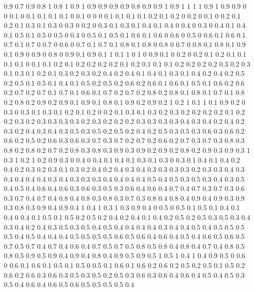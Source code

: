 0.9 0.7
0.9 0.8
1 0.8
1 0.9
1 0.9
0.9 0.9
0.9 0.8
0.9 0.9
1 0.9
1 1
1 1
0.9 1
0.9 0.9
0 0
0.1 0
0.1 0.1
0.1 0.1
0 0.1
0 0
0 0.1
0.1 0.1
0.1 0.2
0.1 0.2
0 0.2
0 0.1
0 0.2
0.1 0.2
0.1 0.3
0.1 0.3
0 0.3
0 0.2
0 0.3
0.1 0.3
0.1 0.4
0.1 0.4
0 0.4
0 0.3
0 0.4
0.1 0.4
0.1 0.5
0.1 0.5
0 0.5
0 0.4
0 0.5
0.1 0.5
0.1 0.6
0.1 0.6
0 0.6
0 0.5
0 0.6
0.1 0.6
0.1 0.7
0.1 0.7
0 0.7
0 0.6
0 0.7
0.1 0.7
0.1 0.8
0.1 0.8
0 0.8
0 0.7
0 0.8
0.1 0.8
0.1 0.9
0.1 0.9
0 0.9
0 0.8
0 0.9
0.1 0.9
0.1 1
0.1 1
0 1
0 0.9
0.1 0
0.2 0
0.2 0.1
0.2 0.1
0.1 0.1
0.1 0
0.1 0.1
0.2 0.1
0.2 0.2
0.2 0.2
0.1 0.2
0.1 0.1
0.1 0.2
0.2 0.2
0.2 0.3
0.2 0.3
0.1 0.3
0.1 0.2
0.1 0.3
0.2 0.3
0.2 0.4
0.2 0.4
0.1 0.4
0.1 0.3
0.1 0.4
0.2 0.4
0.2 0.5
0.2 0.5
0.1 0.5
0.1 0.4
0.1 0.5
0.2 0.5
0.2 0.6
0.2 0.6
0.1 0.6
0.1 0.5
0.1 0.6
0.2 0.6
0.2 0.7
0.2 0.7
0.1 0.7
0.1 0.6
0.1 0.7
0.2 0.7
0.2 0.8
0.2 0.8
0.1 0.8
0.1 0.7
0.1 0.8
0.2 0.8
0.2 0.9
0.2 0.9
0.1 0.9
0.1 0.8
0.1 0.9
0.2 0.9
0.2 1
0.2 1
0.1 1
0.1 0.9
0.2 0
0.3 0
0.3 0.1
0.3 0.1
0.2 0.1
0.2 0
0.2 0.1
0.3 0.1
0.3 0.2
0.3 0.2
0.2 0.2
0.2 0.1
0.2 0.2
0.3 0.2
0.3 0.3
0.3 0.3
0.2 0.3
0.2 0.2
0.2 0.3
0.3 0.3
0.3 0.4
0.3 0.4
0.2 0.4
0.2 0.3
0.2 0.4
0.3 0.4
0.3 0.5
0.3 0.5
0.2 0.5
0.2 0.4
0.2 0.5
0.3 0.5
0.3 0.6
0.3 0.6
0.2 0.6
0.2 0.5
0.2 0.6
0.3 0.6
0.3 0.7
0.3 0.7
0.2 0.7
0.2 0.6
0.2 0.7
0.3 0.7
0.3 0.8
0.3 0.8
0.2 0.8
0.2 0.7
0.2 0.8
0.3 0.8
0.3 0.9
0.3 0.9
0.2 0.9
0.2 0.8
0.2 0.9
0.3 0.9
0.3 1
0.3 1
0.2 1
0.2 0.9
0.3 0
0.4 0
0.4 0.1
0.4 0.1
0.3 0.1
0.3 0
0.3 0.1
0.4 0.1
0.4 0.2
0.4 0.2
0.3 0.2
0.3 0.1
0.3 0.2
0.4 0.2
0.4 0.3
0.4 0.3
0.3 0.3
0.3 0.2
0.3 0.3
0.4 0.3
0.4 0.4
0.4 0.4
0.3 0.4
0.3 0.3
0.3 0.4
0.4 0.4
0.4 0.5
0.4 0.5
0.3 0.5
0.3 0.4
0.3 0.5
0.4 0.5
0.4 0.6
0.4 0.6
0.3 0.6
0.3 0.5
0.3 0.6
0.4 0.6
0.4 0.7
0.4 0.7
0.3 0.7
0.3 0.6
0.3 0.7
0.4 0.7
0.4 0.8
0.4 0.8
0.3 0.8
0.3 0.7
0.3 0.8
0.4 0.8
0.4 0.9
0.4 0.9
0.3 0.9
0.3 0.8
0.3 0.9
0.4 0.9
0.4 1
0.4 1
0.3 1
0.3 0.9
0.4 0
0.5 0
0.5 0.1
0.5 0.1
0.4 0.1
0.4 0
0.4 0.1
0.5 0.1
0.5 0.2
0.5 0.2
0.4 0.2
0.4 0.1
0.4 0.2
0.5 0.2
0.5 0.3
0.5 0.3
0.4 0.3
0.4 0.2
0.4 0.3
0.5 0.3
0.5 0.4
0.5 0.4
0.4 0.4
0.4 0.3
0.4 0.4
0.5 0.4
0.5 0.5
0.5 0.5
0.4 0.5
0.4 0.4
0.4 0.5
0.5 0.5
0.5 0.6
0.5 0.6
0.4 0.6
0.4 0.5
0.4 0.6
0.5 0.6
0.5 0.7
0.5 0.7
0.4 0.7
0.4 0.6
0.4 0.7
0.5 0.7
0.5 0.8
0.5 0.8
0.4 0.8
0.4 0.7
0.4 0.8
0.5 0.8
0.5 0.9
0.5 0.9
0.4 0.9
0.4 0.8
0.4 0.9
0.5 0.9
0.5 1
0.5 1
0.4 1
0.4 0.9
0.5 0
0.6 0
0.6 0.1
0.6 0.1
0.5 0.1
0.5 0
0.5 0.1
0.6 0.1
0.6 0.2
0.6 0.2
0.5 0.2
0.5 0.1
0.5 0.2
0.6 0.2
0.6 0.3
0.6 0.3
0.5 0.3
0.5 0.2
0.5 0.3
0.6 0.3
0.6 0.4
0.6 0.4
0.5 0.4
0.5 0.3
0.5 0.4
0.6 0.4
0.6 0.5
0.6 0.5
0.5 0.5
0.5 0.4
